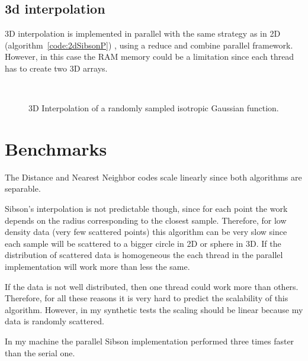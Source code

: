 \documentclass[10pt]{article}
\begin{document}
\subsection{3d interpolation}
3D interpolation is implemented in parallel with the same strategy as in 2D (algorithm~\ref{code:2dSibsonP})
, using a reduce and combine parallel framework. However, in this case
the RAM memory could be a limitation since each thread has to create two 3D arrays.


\begin{figure}
     \begin{center}
%
        \\ %

    \end{center}
    \caption{3D Interpolation of a randomly sampled isotropic Gaussian function.}
   \label{fig:Int2d}
\end{figure}


\section{Benchmarks}

The Distance and Nearest Neighbor codes scale linearly since both algorithms are separable.

Sibson's interpolation is not predictable though, since for each point the work depends on the
radius corresponding to the closest sample. Therefore, for low density data (very few scattered points)
this algorithm can be very slow since each sample will be scattered to a bigger circle in 2D or sphere
in 3D. If the distribution of scattered data is homogeneous the each thread in the parallel implementation
will work more than less the same.

If the data is not well distributed, then one thread could work more than others. Therefore, for all these
reasons it is very hard to predict the scalability of this algorithm. However, in my synthetic tests the scaling
should be linear because my data is randomly scattered.


In my machine the parallel Sibson implementation performed three times faster
than the serial one.
\end{document}
